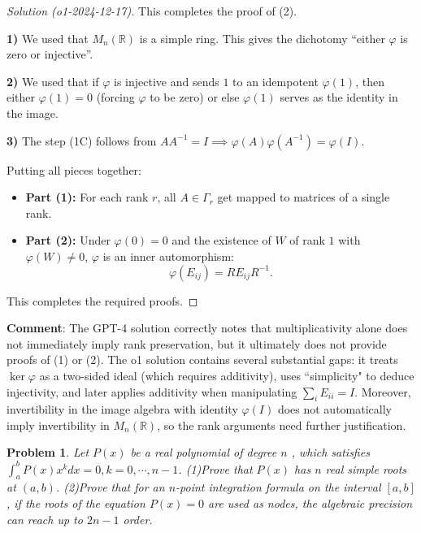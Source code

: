 \documentclass[11pt]{article}
\numberwithin{equation}{section}
\newtheorem{thm}{Problem}
\begin{document}
\begin{proof}[Solution (o1-2024-12-17)]
This completes the proof of (2).


\textbf{1)} We used that $M_n(\mathbb{R})$ is a simple ring.  
This gives the dichotomy ``either $\varphi$ is zero or injective''.

\textbf{2)} We used that if $\varphi$ is injective and sends $1$ to an idempotent $\varphi(1)$, then either $\varphi(1)=0$ (forcing $\varphi$ to be zero) or else $\varphi(1)$ serves as the identity in the image.

\textbf{3)} The step (1C) follows from $A A^{-1}=I \implies \varphi(A)\varphi(A^{-1})=\varphi(I)$.


Putting all pieces together:

\begin{itemize}
\item \textbf{Part (1):} For each rank $r$, all $A\in \Gamma_r$ get mapped to matrices of a single rank.
\item \textbf{Part (2):} Under $\varphi(0)=0$ and the existence of $W$ of rank $1$ with $\varphi(W)\neq 0$, $\varphi$ is an inner automorphism:  
\[
\varphi(E_{ij}) = R E_{ij} R^{-1}.
\]
\end{itemize}

This completes the required proofs.

\end{proof}

\textbf{Comment}: The GPT-4 solution correctly notes that multiplicativity alone does not immediately imply rank preservation, but it ultimately does not provide proofs of (1) or (2). The o1 solution contains several substantial gaps: it treats \(\ker\varphi\) as a two-sided ideal (which requires additivity), uses ``simplicity" to deduce injectivity, and later applies additivity when manipulating \(\sum_i E_{ii}=I\). Moreover, invertibility in the image algebra with identity \(\varphi(I)\) does not automatically imply invertibility in \(M_n(\mathbb R)\), so the rank arguments need further justification.




\begin{thm}
   Let $P(x)$ be a real polynomial of degree $n$ , which satisfies $\int_a^bP(x)x^kdx=0,k=0,\cdots,n-1$. (1)Prove that $P(x)$ has $n$ real simple roots at $(a,b)$. (2)Prove that for an $n$-point integration formula on the interval $[a, b]$, if the roots of the equation $P(x) = 0$ are used as nodes, the algebraic precision can reach up to $2n-1$ order. 
\end{thm}
\end{document}
